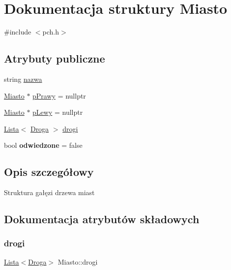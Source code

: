 \hypertarget{struct_miasto}{}\section{Dokumentacja struktury Miasto}
\label{struct_miasto}


{\ttfamily \#include $<$pch.\+h$>$}

\subsection*{Atrybuty publiczne}
\begin{DoxyCompactItemize}
\item 
string \mbox{\hyperlink{struct_miasto_ad0aaa5efaebeeff46f1673552035c7cb}{nazwa}}
\item 
\mbox{\hyperlink{struct_miasto}{Miasto}} $\ast$ \mbox{\hyperlink{struct_miasto_a3ceb4e22b45acaf62e032d2e233aea1e}{p\+Prawy}} = nullptr
\item 
\mbox{\hyperlink{struct_miasto}{Miasto}} $\ast$ \mbox{\hyperlink{struct_miasto_adc7b4137bfc3e62c95d9acf316fa620d}{p\+Lewy}} = nullptr
\item 
\mbox{\hyperlink{class_lista}{Lista}}$<$ \mbox{\hyperlink{struct_droga}{Droga}} $>$ \mbox{\hyperlink{struct_miasto_aeb7c15cc353ac8dd6ca7c415931b9dbd}{drogi}}
\item 
\mbox{\label{struct_miasto_af2f07daa89e6462c84434d00011f9ee6}} 
bool {\bfseries odwiedzone} = false
\end{DoxyCompactItemize}


\subsection{Opis szczegółowy}
Struktura gałęzi drzewa miast 

\subsection{Dokumentacja atrybutów składowych}
\mbox{\label{struct_miasto_aeb7c15cc353ac8dd6ca7c415931b9dbd}} 
\subsubsection{\texorpdfstring{drogi}{drogi}}
{\footnotesize\ttfamily \mbox{\hyperlink{class_lista}{Lista}}$<$\mbox{\hyperlink{struct_droga}{Droga}}$>$ Miasto\+::drogi}

